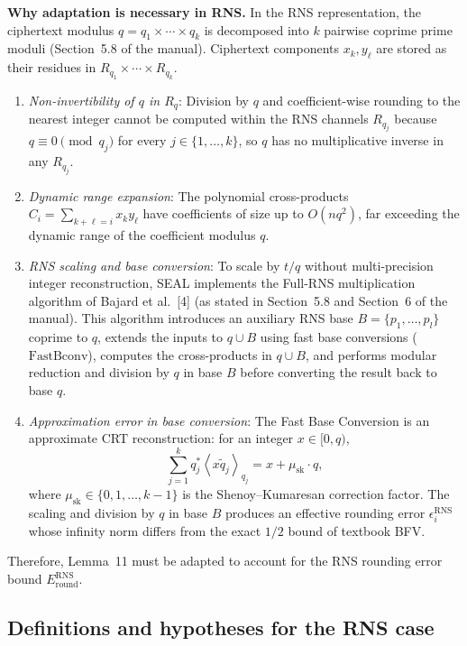 \documentclass[11pt]{article}
\newcommand{\qstar}[1]{q^{*}_{#1}}
\newcommand{\qtilde}[1]{\tilde{q}_{#1}}
\newcommand{\musk}{\mu_{\mathrm{sk}}}
\newcommand{\fastbconv}{\mathrm{FastBconv}}
\newcommand{\ur}[2]{\left\langle #1\right\rangle_{#2}}   %
\theoremstyle{plain}
\theoremstyle{definition}
\theoremstyle{remark}
\begin{document}
\textbf{Why adaptation is necessary in RNS.}
In the RNS representation, the ciphertext modulus $q = q_1\times\cdots\times q_k$ is decomposed into
$k$ pairwise coprime prime moduli (Section~5.8 of the manual). Ciphertext components $x_k, y_\ell$ are
stored as their residues in $R_{q_1}\times\cdots\times R_{q_k}$.
\begin{enumerate}[leftmargin=2.5em,label=(M\arabic*)]
\item \emph{Non-invertibility of $q$ in $R_q$}: Division by $q$ and coefficient-wise rounding to the
nearest integer cannot be computed within the RNS channels $R_{q_j}$ because $q\equiv 0\pmod{q_j}$
for every $j\in\{1,\dots,k\}$, so $q$ has no multiplicative inverse in any $R_{q_j}$.
\item \emph{Dynamic range expansion}: The polynomial cross-products $C_i = \sum_{k+\ell=i}x_ky_\ell$
have coefficients of size up to $O(nq^2)$, far exceeding the dynamic range of the coefficient modulus $q$.
\item \emph{RNS scaling and base conversion}: To scale by $t/q$ without multi-precision integer
reconstruction, SEAL implements the Full-RNS multiplication algorithm of Bajard et al.~[4]
(as stated in Section~5.8 and Section~6 of the manual). This algorithm introduces an auxiliary RNS
base $B = \{p_1,\dots,p_l\}$ coprime to $q$, extends the inputs to $q\cup B$ using fast base conversions
($\fastbconv$), computes the cross-products in $q\cup B$, and performs modular reduction and division
by $q$ in base $B$ before converting the result back to base $q$.
\item \emph{Approximation error in base conversion}: The Fast Base Conversion is an approximate CRT
reconstruction: for an integer $x\in[0,q)$,
\[
 \sum_{j=1}^{k}\qstar{j}\ur{x\qtilde{j}}{q_j} = x + \musk\cdot q ,
\]
where $\musk\in\{0,1,\dots,k-1\}$ is the Shenoy--Kumaresan correction factor. The scaling and division
by $q$ in base $B$ produces an effective rounding error $\epsilon_i^{\mathrm{RNS}}$ whose infinity norm
differs from the exact $1/2$ bound of textbook BFV.
\end{enumerate}
Therefore, Lemma~11 must be adapted to account for the RNS rounding error bound $E_{\mathrm{round}}^{\mathrm{RNS}}$.

\subsection{Definitions and hypotheses for the RNS case}
\end{document}
